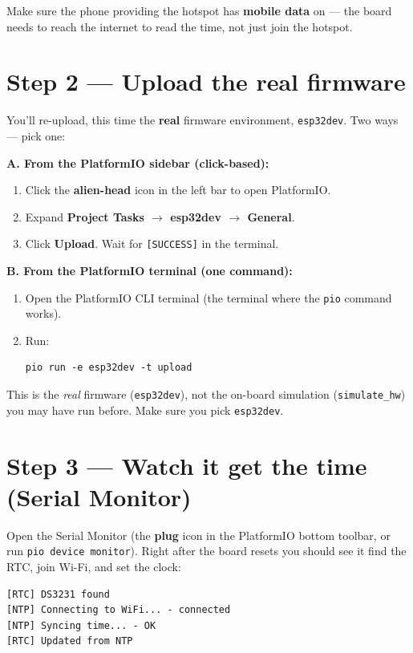 \documentclass[11pt]{article}
\begin{document}
\begin{tip}
Make sure the phone providing the hotspot has \textbf{mobile data} on --- the board
needs to reach the internet to read the time, not just join the hotspot.
\end{tip}

\section{Step 2 --- Upload the real firmware}
You'll re-upload, this time the \textbf{real} firmware environment,
\texttt{esp32dev}. Two ways --- pick one:

\textbf{A. From the PlatformIO sidebar (click-based):}
\begin{enumerate}
  \item Click the \textbf{alien-head} icon in the left bar to open PlatformIO.
  \item Expand \textbf{Project Tasks \(\rightarrow\) esp32dev \(\rightarrow\) General}.
  \item Click \textbf{Upload}. Wait for \texttt{[SUCCESS]} in the terminal.
\end{enumerate}

\textbf{B. From the PlatformIO terminal (one command):}
\begin{enumerate}
  \item Open the PlatformIO CLI terminal (the terminal where the \texttt{pio}
        command works).
  \item Run:
\begin{lstlisting}
pio run -e esp32dev -t upload
\end{lstlisting}
\end{enumerate}

\begin{note}
This is the \emph{real} firmware (\texttt{esp32dev}), not the on-board simulation
(\texttt{simulate\_hw}) you may have run before. Make sure you pick \texttt{esp32dev}.
\end{note}

\section{Step 3 --- Watch it get the time (Serial Monitor)}
Open the Serial Monitor (the \textbf{plug} icon in the PlatformIO bottom toolbar, or
run \texttt{pio device monitor}). Right after the board resets you should see it
find the RTC, join Wi-Fi, and set the clock:
\begin{lstlisting}
[RTC] DS3231 found
[NTP] Connecting to WiFi... - connected
[NTP] Syncing time... - OK
[RTC] Updated from NTP
\end{lstlisting}
\end{document}
